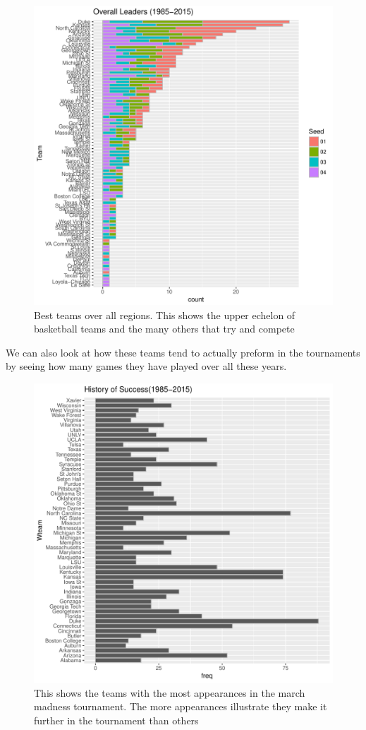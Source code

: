 \documentclass[]{scrartcl}
\begin{document}
\begin{figure}[H]
	\centering
	\includegraphics[scale=.75]{overLeaders.pdf}
	\caption[overallLeaders]{Best teams over all regions. This shows the upper echelon of basketball teams and the many others that try and compete}
	\label{rVals}
\end{figure}
We can also look at how these teams tend to actually preform in the tournaments by seeing how many games they have played over all these years.
\begin{figure}[H]
	\centering
	\includegraphics[scale=.75]{HistOfSuccess2.pdf}
	\caption[HistOfSuccess]{This shows the teams with the most appearances in the march madness tournament. The more appearances illustrate they make it further in the tournament than others}
	\label{rVals}
\end{figure}
\end{document}
